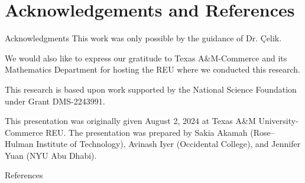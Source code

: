 \documentclass{reu_beamer}
\begin{document}
\section{Acknowledgements and References}
    \begin{frame}{Acknowledgments}
    \centering
    This work was only possible by the guidance of Dr. \c{C}elik.\newline
    
    We would also like to express our gratitude to Texas A\&M-Commerce and its Mathematics Department for hosting the REU where we conducted this research.\newline
    
    This research is based upon work supported by the National Science Foundation under Grant DMS-2243991.\newline
    
    This presentation was originally given August 2, 2024 at Texas A\&M University-Commerce REU. The presentation was prepared by Sakia Akamah (Rose--Hulman Institute of Technology), Avinash Iyer (Occidental College), and Jennifer Yuan (NYU Abu Dhabi).
\end{frame}
%
\begin{frame}[allowframebreaks]{References}
\nocite{*}

{\small}
\end{frame}

\end{document}
